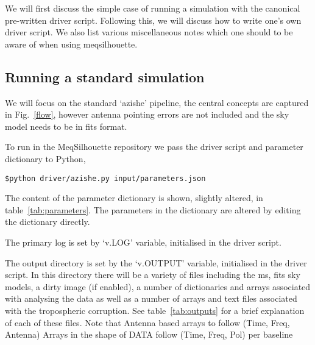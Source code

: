 We will first discuss the simple case of running a simulation with the canonical pre-written driver script. Following this, we will discuss how to write one's own driver script. We also list various miscellaneous notes which one should to be aware of when using {\sc meqsilhouette}.
\subsection{Running a standard simulation}

We will focus on the standard `azishe' pipeline, the central concepts are captured in Fig.~\ref{flow}, however antenna pointing errors are not included and the sky model needs to be in {\sc fits} format. 

To run in the MeqSilhouette repository we pass the driver script and parameter dictionary to {\sc Python},
\begin{verbatim}
$python driver/azishe.py input/parameters.json
\end{verbatim}


The content of the parameter dictionary is shown, slightly altered, in table~\ref{tab:parameters}. The parameters in the dictionary are altered by editing the dictionary directly. 

The primary log is set by `v.LOG' variable, initialised in the driver script. 

The output directory is set by the `v.OUTPUT' variable, initialised in the driver script. In this directory there will be a variety of files including the {\sc ms}, {\sc fits} sky models, a dirty image (if enabled), a number of dictionaries and arrays associated with analysing the data as well as a number of arrays and text files associated with the tropospheric corruption. See table~\ref{tab:outputs} for a brief explanation of each of these files. Note that Antenna based arrays to follow (Time, Freq, Antenna)
Arrays in the shape of DATA follow (Time, Freq, Pol) per baseline


